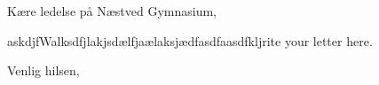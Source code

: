 \documentclass[11pt,a4paper]{letter}
\date{\vest\today}
\let\letterclassopening\opening
\renewcommand{\opening}[1]{\letterclassopening{#1}\vspace{2em}}
\renewcommand{\closing}[1]{\par\vspace{2em}\noindent #1\par\vspace{1em}\noindent\fromsig\par}
\begin{document}
\begin{letter}{}
\opening{Kære ledelse på Næstved Gymnasium,}

askdjfWalksdfjlakjsdælfjaælaksjædfasdfaasdfkljrite your letter here.
\closing{Venlig hilsen,}

\end{letter}
\end{document}
